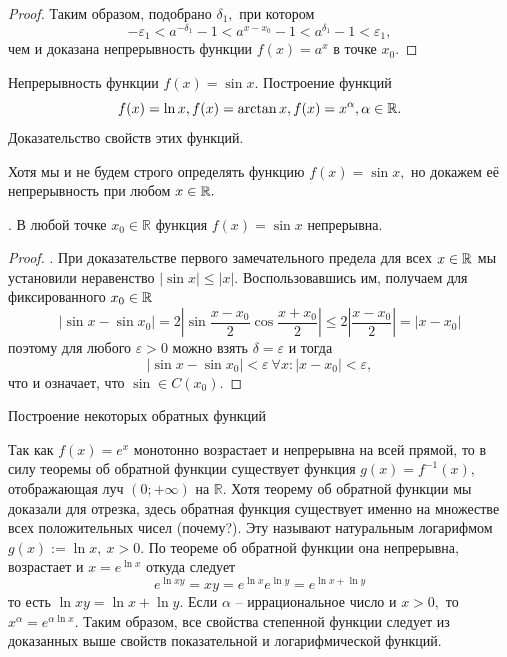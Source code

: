 \begin{proof}
    Таким образом, подобрано
    $\delta_1,$ при котором
    $$ -\varepsilon_1 < a^{-\delta_1} - 1
        < a^{x - x_0} - 1 < a^{\delta_1} - 1
        < \varepsilon_1,
    $$
    чем и доказана непрерывность функции
    $f(x)=a^x$ в точке $x_0.$
\end{proof}


\newpage

\begin{problem}
Непрерывность функции $f(x) = \sin x$. Построение функций
\begin{equation}
    f(x) = \ln x, f(x) = \arctan x, f(x) = x^\alpha, \alpha \in \mathbb{R}.
\end{equation}
Доказательство свойств этих функций.
\end{problem}

Хотя мы и не будем строго определять
функцию $f(x)=\sin x,$ но докажем её непрерывность
при любом $x\in\mathbb{R}.$
\begin{proposition}.
    В любой точке
    $x_0 \in \mathbb R$ функция $f(x)=\sin x$ непрерывна.
\end{proposition}
\begin{proof}.
    При доказательстве первого замечательного предела
    для всех $x\in\mathbb{R}$ мы установили неравенство
    $|\sin x| \leq |x|.$
    Воспользовавшись им, получаем для фиксированного
    $x_0\in\mathbb{R}$
    $$
        |\sin x - \sin x_0| = 2|\sin\frac{x-x_0}{2}
        \cos\frac{x+x_0}{2}| \leq 2 |\frac{x - x_0}{2}|
        = |x-x_0|
    $$
    поэтому для любого
    $\varepsilon > 0$ можно взять
    $\delta = \varepsilon$ и тогда
    $$
        |\sin x - \sin x_0| < \varepsilon \ \forall x:
        |x-x_0| < \varepsilon,
    $$
    что и означает, что
    $\sin \in C(x_0)$.
\end{proof}


\begin{center}
    \textsf{Построение некоторых обратных функций}
\end{center}

Так как $f(x)=e^x$ монотонно возрастает и непрерывна
на всей прямой, то в силу теоремы об обратной
функции существует функция $g(x)=f^{-1}(x),$
отображающая луч $(0; +\infty)$ на $\mathbb R$.
Хотя теорему об обратной функции
мы доказали для отрезка, здесь обратная
функция существует именно на множестве
всех положительных чисел (почему?).
Эту называют натуральным логарифмом
$g(x) := \ln x, \ x>0$. По теореме об обратной
функции она непрерывна, возрастает и
$x = e^{\ln x}$ откуда следует
$$
    e^{\ln xy} = xy = e^{\ln x} e^{\ln y} = e^{\ln x+\ln y}
$$
то есть $\ln xy = \ln x + \ln y.$
Если $\alpha$ -- иррациональное число и $x>0,$
то $x^\alpha = e^{\alpha \ln x}.$
Таким образом, все свойства степенной
функции следует из доказанных
выше свойств показательной и логарифмической функций.

